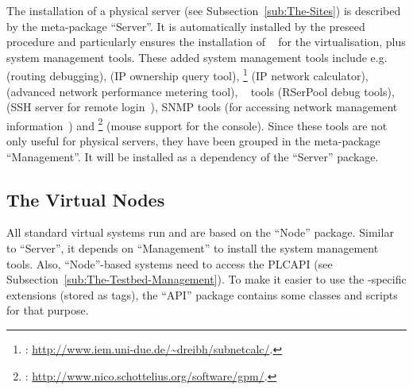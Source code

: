 The installation of a physical server (see Subsection~\ref{sub:The-Sites}) is described by the meta-package ``Server''. It is automatically installed by the preseed procedure and particularly ensures the installation of ~\cite{VirtualBoxUserManual} for the virtualisation, plus system management tools.
These added system management tools include e.g.\  (routing debugging),  (IP ownership query tool), \footnote{: \url{http://www.iem.uni-due.de/~dreibh/subnetcalc/}.} (IP network calculator), ~\cite{SoftCOM2011} (advanced network performance metering tool), ~\cite{Dre2006} tools (RSerPool debug tools),  (SSH server for remote login~\cite{RFC4254}), SNMP tools (for accessing network management information~\cite{RFC3411}) and \footnote{: \url{http://www.nico.schottelius.org/software/gpm/}.} (mouse support for the console). Since these tools are not only useful for physical servers, they have been grouped in the meta-package ``Management''. It will be installed as a dependency of the ``Server'' package.


\subsection{The Virtual Nodes}
\label{sub:The-Nodes}

All standard virtual  systems run  and are based on the ``Node'' package. Similar to ``Server'', it depends on ``Management'' to install the system management tools. Also, ``Node''-based systems need to access the PLCAPI (see Subsection~\ref{sub:The-Testbed-Management}). To make it easier to use the -specific extensions (stored as tags), the ``API'' package contains some  classes and scripts for that purpose.

